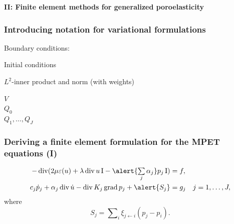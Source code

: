 \documentclass[10pt, mathserif, aspectratio=169, t]{beamer}
\DeclareMathOperator{\Div}{\mathrm{div}}
\DeclareMathOperator{\Grad}{\mathrm{grad}}
\newcommand{\foralls}{\forall \;}
\newcommand{\mysection}[1]{\begin{frame} \begin{center} \vspace{3em} \textbf{#1} \end{center} \end{frame}}
\DeclareMathOperator{\ssum}{\textstyle \sum}
\begin{document}

\mysection{II: Finite element methods for generalized poroelasticity}

\begin{frame}
\frametitle{Introducing notation for variational formulations}

Boundary conditions:

\bigskip
\bigskip

Initial conditions

\bigskip
\bigskip

$L^2$-inner product and norm (with weights)

\bigskip
\bigskip
\bigskip

$V$ \\
\bigskip
$Q_0$ \\
\bigskip
$Q_1, \dots, Q_J$

\end{frame}

\begin{frame}
  \frametitle{Deriving a finite element formulation for the MPET equations (I)}
  \begin{align*}
    - \Div (2 \mu \varepsilon(u) + \lambda \Div u \, \mathrm{I} - \alert{\ssum_{j} \alpha_j} p_j \, \mathrm{I} ) &= f, \\
    c_{j} \dot{p}_{j} + \alpha_{j} \Div \dot{u} - \Div K_{j} \Grad p_{j} + \alert{S_j} &= g_{j} \quad j = 1, \dots, J,
  \end{align*}
  where
  \begin{equation*}
    S_{j} =  \ssum_{i} \xi_{j \leftarrow i} (p_{j} - p_{i}).
  \end{equation*}
\end{frame}

\begin{frame}
  \frametitle{}
\end{frame}
\end{document}
